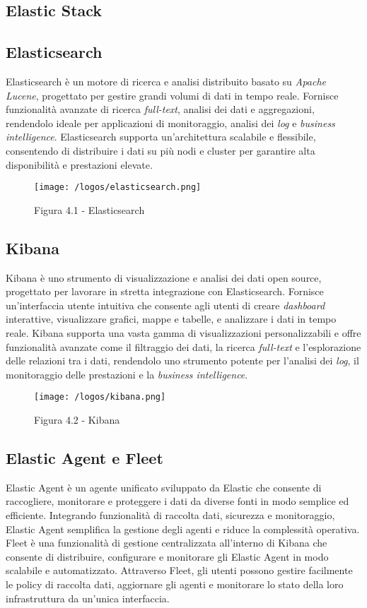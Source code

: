 \subsection{Elastic Stack}

\subsection*{Elasticsearch}
Elasticsearch è un motore di ricerca e analisi distribuito basato su \emph{Apache Lucene}, progettato per gestire grandi volumi di dati in tempo reale. Fornisce funzionalità avanzate di ricerca \emph{full-text}, analisi dei dati e aggregazioni, rendendolo ideale per applicazioni di monitoraggio, analisi dei \emph{log} e \emph{business intelligence}. Elasticsearch supporta un'architettura scalabile e flessibile, consentendo di distribuire i dati su più nodi e cluster per garantire alta disponibilità e prestazioni elevate.
\begin{figure}[H] 
    \centering 
    \texttt{[image: /logos/elasticsearch.png]} 
    \caption{Figura 4.1 - Elasticsearch}
\end{figure}


\subsection*{Kibana}
Kibana è uno strumento di visualizzazione e analisi dei dati open source, progettato per lavorare in stretta integrazione con Elasticsearch. Fornisce un'interfaccia utente intuitiva che consente agli utenti di creare \emph{dashboard} interattive, visualizzare grafici, mappe e tabelle, e analizzare i dati in tempo reale. Kibana supporta una vasta gamma di visualizzazioni personalizzabili e offre funzionalità avanzate come il filtraggio dei dati, la ricerca \emph{full-text} e l'esplorazione delle relazioni tra i dati, rendendolo uno strumento potente per l'analisi dei \emph{log}, il monitoraggio delle prestazioni e la \emph{business intelligence}.
\begin{figure}[H] 
    \centering 
    \texttt{[image: /logos/kibana.png]} 
    \caption{Figura 4.2 - Kibana}
\end{figure}


\subsection*{Elastic Agent e Fleet}
Elastic Agent è un agente unificato sviluppato da Elastic che consente di raccogliere, monitorare e proteggere i dati da diverse fonti in modo semplice ed efficiente. Integrando funzionalità di raccolta dati, sicurezza e monitoraggio, Elastic Agent semplifica la gestione degli agenti e riduce la complessità operativa. Fleet è una funzionalità di gestione centralizzata all'interno di Kibana che consente di distribuire, configurare e monitorare gli Elastic Agent in modo scalabile e automatizzato. Attraverso Fleet, gli utenti possono gestire facilmente le policy di raccolta dati, aggiornare gli agenti e monitorare lo stato della loro infrastruttura da un'unica interfaccia.


